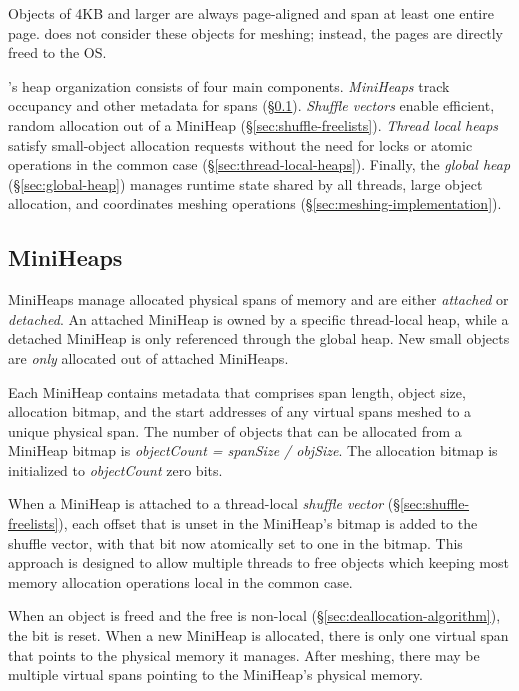 Objects of 4KB and larger are always page-aligned and span at least one
entire page. \Mesh does not consider these objects for meshing;
instead, the pages are directly freed to the OS.

\Mesh's heap organization consists of four main components.
\emph{MiniHeaps} track occupancy and other metadata for spans
(\S\ref{sec:miniheaps}).  \textit{Shuffle vectors} enable efficient,
random allocation out of a MiniHeap (\S\ref{sec:shuffle-freelists}).
\textit{Thread local heaps} satisfy small-object allocation requests
without the need for locks or atomic operations in the common case
(\S\ref{sec:thread-local-heaps}). Finally, the \textit{global heap}
(\S\ref{sec:global-heap}) manages runtime state shared by all threads,
large object allocation, and coordinates meshing operations
(\S\ref{sec:meshing-implementation}).


\subsection{MiniHeaps}
\label{sec:miniheaps}

MiniHeaps manage allocated physical spans of memory and are either
\emph{attached} or \emph{detached}.  An attached MiniHeap is owned by
a specific thread-local heap, while a detached MiniHeap is only
referenced through the global heap.  New small objects are
\textit{only} allocated out of attached MiniHeaps.

Each MiniHeap contains metadata that comprises span length, object
size, allocation bitmap, and the start addresses of any virtual spans
meshed to a unique physical span.  The number of objects that can be
allocated from a MiniHeap bitmap is \textit{objectCount = spanSize /
  objSize}.  The allocation bitmap is initialized to
\textit{objectCount} zero bits.

When a MiniHeap is attached to a
thread-local \emph{shuffle vector} (\S\ref{sec:shuffle-freelists}),
each offset that is unset in the MiniHeap's bitmap is added to the
shuffle vector, with that bit now atomically set to one in the bitmap.
This approach is designed to allow multiple threads to free objects
which keeping most memory allocation operations local in the common
case.

When an object is freed and the free is non-local
(\S\ref{sec:deallocation-algorithm}), the bit is reset.  When a new
MiniHeap is allocated, there is only one virtual span that points to
the physical memory it manages. After meshing, there may be multiple
virtual spans pointing to the MiniHeap's physical memory.


